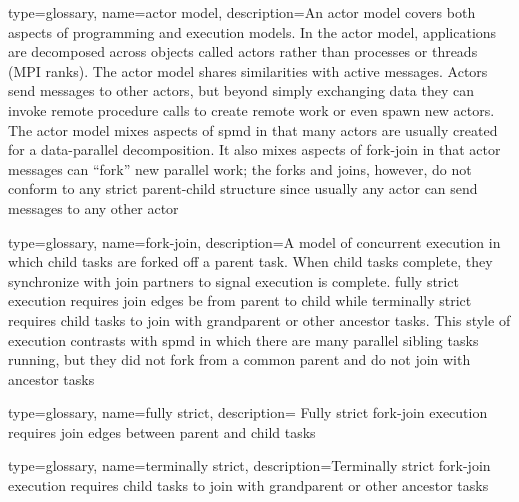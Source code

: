 {
  type=glossary,
  name={actor model},
  description={An actor model covers both aspects of programming and
    \glspl{execution model}.  In the actor model,
  applications are decomposed across objects called actors rather than processes or threads (\gls{MPI} ranks). The actor model shares similarities with active messages.  Actors send messages to other actors, but beyond simply exchanging data they can invoke remote procedure calls to create remote work or even spawn new actors.  The actor model mixes aspects of \gls{spmd} in that many actors are usually created for a data-parallel decomposition.  It also mixes aspects of \gls{fork-join} in that actor messages can ``fork'' new parallel work; the forks and joins, however, do not conform to any strict parent-child structure since usually any actor can send messages to any other actor}  
}

{
  type=glossary,
  name={fork-join},
  description={A model of concurrent execution in which child tasks are forked
    off a parent task.  When child tasks complete, they synchronize with join
      partners to signal execution is complete.  \Gls{fully strict} execution
      requires join edges be from parent to child while \gls{terminally strict} requires child tasks to join with grandparent or other ancestor tasks. This style of execution contrasts with \gls{spmd} in which there are many parallel sibling tasks running, but they did not fork from a common parent and do not join with ancestor tasks}
}

{
  type=glossary,
  name={fully strict},
  description={ Fully strict \gls{fork-join} execution requires join edges between parent and
    child tasks} 
}

{
  type=glossary,
  name={terminally strict},
  description={Terminally strict \gls{fork-join} execution requires child tasks to join with
    grandparent or other ancestor tasks}
}

